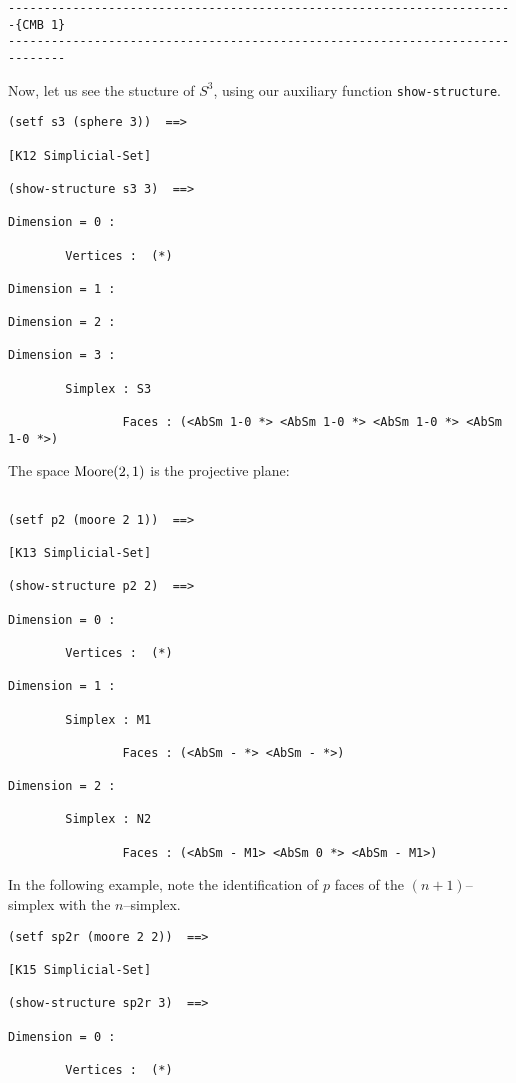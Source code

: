 {{\begin{verbatim}
-----------------------------------------------------------------------{CMB 1}
------------------------------------------------------------------------------

\end{verbatim}}

Now, let us see the stucture of $S^3$, using our auxiliary function {\tt show-structure}.
{\footnotesize\begin{verbatim}
(setf s3 (sphere 3))  ==>

[K12 Simplicial-Set]

(show-structure s3 3)  ==>

Dimension = 0 :

        Vertices :  (*)

Dimension = 1 :

Dimension = 2 :

Dimension = 3 :

        Simplex : S3

                Faces : (<AbSm 1-0 *> <AbSm 1-0 *> <AbSm 1-0 *> <AbSm 1-0 *>)
\end{verbatim}}

The space ${\rm Moore}(2,1)$ is the projective plane:
{\footnotesize\begin{verbatim}

(setf p2 (moore 2 1))  ==>

[K13 Simplicial-Set]

(show-structure p2 2)  ==>

Dimension = 0 :

        Vertices :  (*)

Dimension = 1 :

        Simplex : M1

                Faces : (<AbSm - *> <AbSm - *>)

Dimension = 2 :

        Simplex : N2

                Faces : (<AbSm - M1> <AbSm 0 *> <AbSm - M1>)
\end{verbatim}}
In the following example, note the identification of $p$ faces
of the $(n+1)$--simplex with the $n$--simplex.
{\footnotesize\begin{verbatim}
(setf sp2r (moore 2 2))  ==>

[K15 Simplicial-Set]

(show-structure sp2r 3)  ==>

Dimension = 0 :

        Vertices :  (*)


\end{verbatim}}}
